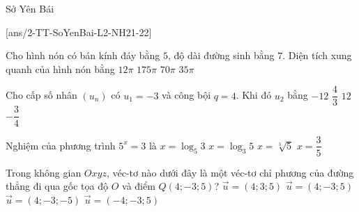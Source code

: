 \begin{name}
	{\tenchude}
	{\tendethi}
	{Sở Yên Bái}
	{\thoigian}
\end{name}
[ans/2-TT-SoYenBai-L2-NH21-22]


\begin{ex}%
Cho hình nón có bán kính đáy bằng $5$, độ dài đường sinh bằng $7$. Diện tích xung quanh của hình nón bằng
\choice
{$12\pi$}
{$175\pi$}
{$70\pi$}
{\True $35\pi$}
\end{ex}

\begin{ex}%
Cho cấp số nhân $(u_n)$ có $u_1=-3$ và công bội $q=4$. Khi đó $u_2$ bằng
\choice
{\True $-12$}
{$\dfrac{4}{3}$}
{$12$}
{$-\dfrac{3}{4}$}
\end{ex}



\begin{ex}%
Nghiệm của phương trình $5^x=3$ là
\choice
{\True $x=\log_5 3$}
{$x=\log_3 5$}
{$x=\sqrt[3]{5}$}
{$x=\dfrac{3}{5}$}
\end{ex}



\begin{ex}%
Trong không gian $Oxyz$, véc-tơ nào dưới đây là một véc-tơ chỉ phương của đường thẳng đi qua gốc tọa độ $O$ và điểm $Q(4;-3;5)$?
\choice
{$\overrightarrow{u}=(4;3;5)$}
{\True $\overrightarrow{u}=(4;-3;5)$}
{$\overrightarrow{u}=(4;-3;-5)$}
{$\overrightarrow{u}=(-4;-3;5)$}
\end{ex}



